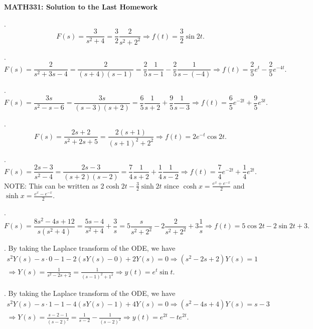\documentclass[12 pt letterpaper]{article}
\newcommand{\LA}{\Longrightarrow}
\begin{document}
\large
\begin{center}
\textbf{MATH331: Solution to the Last Homework}
\end{center}
\vspace{0.6cm}

\normalsize


. 
\[F(s) = \frac{3}{s^2+4} = \frac{3}{2} \frac{2}{s^2 +2^2}
\Longrightarrow f(t) = \frac{3}{2} \sin 2t.\]

. \[F(s) = \frac{2}{s^2 + 3s - 4} = \frac{2}{(s + 4)(s - 1)}
= \frac{2}{5}\frac{1}{s-1} - \frac{2}{5}\frac{1}{s-(-4)}
\Longrightarrow f(t) = \frac{2}{5} e^t -\frac{2}{5} e^{-4t}.\]

. \[F(s) = \frac{3s}{s^2 - s- 6} = \frac{3s}{(s-3)(s+2)}
= \frac{6}{5} \frac{1}{s+2} + \frac{9}{5}\frac{1}{s-3}
\Longrightarrow f(t) = \frac{6}{5} e^{-2t} + \frac{9}{5} e^{3t}.\]

. \[F(s) = \frac{2s + 2}{s^2 +2s+5} = \frac{2(s+1)}{(s+1)^2 +2^2}
\Longrightarrow f(t) = 2 e^{-t}\cos 2t. \]

. \[F(s) = \frac{2s-3}{s^2 -4} = \frac{2s -3}{(s+2)(s-2)}
= \frac{7}{4}\frac{1}{s+2} + \frac{1}{4}\frac{1}{s-2}
\Longrightarrow f(t) = \frac{7}{4} e^{-2t} + \frac{1}{4} e^{2t}.\]
NOTE: This can be written as $2 \cosh 2t - \frac{3}{2} \sinh2t$
since $\cosh x = \frac{e^x + e^{-x}}{2}$ and 
$\sinh x = \frac{e^x - e^{-x}}{2}$.

. \[F(s) = \frac{8 s^2 - 4s + 12}{s(s^2+4)} = \frac{5s-4}{s^2+4} + \frac{3}{s}
= 5\frac{s}{s^2+2^2} -2\frac{2}{s^2 + 2^2} +3\frac{1}{s} 
\Longrightarrow f(t) = 5 \cos 2t -2 \sin 2t +3. \]

. By taking the Laplace transform of the ODE, we have
\begin{gather*} s^2 Y(s) -s \cdot 0 - 1 -2(sY(s) - 0) + 2 Y(s) = 0
\Longrightarrow (s^2 -2s + 2) Y(s) = 1 \\
\LA Y(s) = \frac{1}{s^2 -2s + 2} = \frac{1}{(s-1)^2 +1^2}
\LA y(t) = e^t \sin t.  
\end{gather*}

. By taking the Laplace transform of the ODE, we have
\begin{gather*} s^2 Y(s) -s \cdot 1 - 1 -4(sY(s) - 1) + 4Y(s) = 0
\LA (s^2 -4s +4) Y(s) = s -3 \\
\LA  Y(s) = \frac{s-2 -1}{(s-2)^2} = \frac{1}{s-2} - \frac{1}{(s-2)^2}
\LA y(t) = e^{2t} - te^{2t}. 
\end{gather*}
\end{document}
